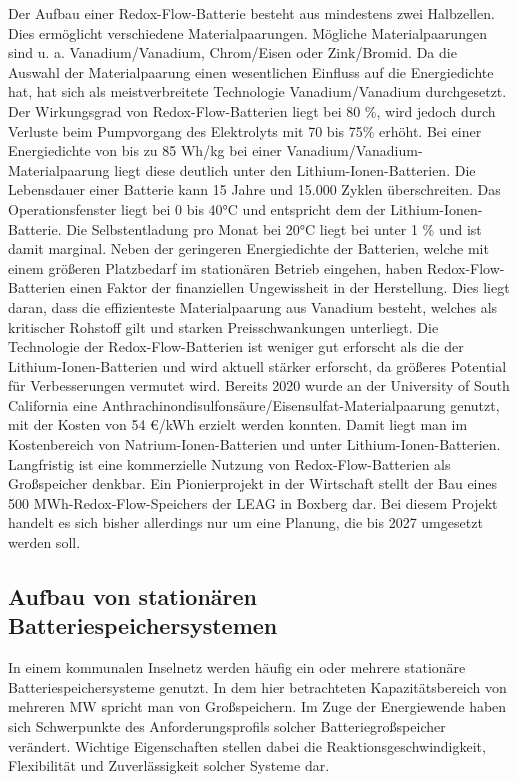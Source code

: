 Der Aufbau einer Redox-Flow-Batterie besteht aus mindestens zwei Halbzellen. Dies ermöglicht verschiedene Materialpaarungen. 
Mögliche Materialpaarungen sind u. a. Vanadium/Vanadium, Chrom/Eisen oder Zink/Bromid. 
Da die Auswahl der Materialpaarung einen wesentlichen Einfluss auf die Energiedichte hat, 
hat sich als meistverbreitete Technologie Vanadium/Vanadium durchgesetzt. 
Der Wirkungsgrad von Redox-Flow-Batterien liegt bei 80 \%, wird jedoch durch Verluste beim Pumpvorgang des 
Elektrolyts mit 70 bis 75\% erhöht. 
Bei einer Energiedichte von bis zu 85 Wh/kg bei einer Vanadium/Vanadium-Materialpaarung liegt diese deutlich 
unter den Lithium-Ionen-Batterien. Die Lebensdauer einer Batterie kann 15 Jahre und 15.000 Zyklen überschreiten. 
Das Operationsfenster liegt bei 0 bis 40°C und entspricht dem der Lithium-Ionen-Batterie\cite{uni-lecture}. 
Die Selbstentladung pro Monat bei 20°C liegt bei unter 1 \% und ist damit marginal.
Neben der geringeren Energiedichte der Batterien, welche mit einem größeren Platzbedarf im stationären Betrieb eingehen, 
haben Redox-Flow-Batterien einen Faktor der finanziellen Ungewissheit in der Herstellung. 
Dies liegt daran, dass die effizienteste Materialpaarung aus Vanadium besteht, welches als kritischer Rohstoff gilt und 
starken Preisschwankungen unterliegt\cite{cleanthinking}.
Die Technologie der Redox-Flow-Batterien ist weniger gut erforscht als die der Lithium-Ionen-Batterien und wird aktuell stärker erforscht, 
da größeres Potential für Verbesserungen vermutet wird. 
Bereits 2020 wurde an der University of South California eine Anthrachinondisulfonsäure/Eisensulfat-Materialpaarung genutzt, 
mit der Kosten von 54 €/kWh\cite{yang2020redoxflow} erzielt werden konnten. Damit liegt man im Kostenbereich von Natrium-Ionen-Batterien und 
unter Lithium-Ionen-Batterien. Langfristig ist eine kommerzielle Nutzung von Redox-Flow-Batterien als Großspeicher denkbar. 
Ein Pionierprojekt in der Wirtschaft stellt der Bau eines 500 MWh-Redox-Flow-Speichers der LEAG in Boxberg dar. 
Bei diesem Projekt handelt es sich bisher allerdings nur um eine Planung, die bis 2027 umgesetzt werden soll\cite{winfuture-news}.

\subsection{Aufbau von stationären Batteriespeichersystemen}

In einem kommunalen Inselnetz werden häufig ein oder mehrere stationäre Batteriespeichersysteme genutzt. 
In dem hier betrachteten Kapazitätsbereich von mehreren MW spricht man von Großspeichern. 
Im Zuge der Energiewende haben sich Schwerpunkte des Anforderungsprofils solcher Batteriegroßspeicher verändert. 
Wichtige Eigenschaften stellen dabei die Reaktionsgeschwindigkeit, Flexibilität und Zuverlässigkeit solcher Systeme dar.
 
